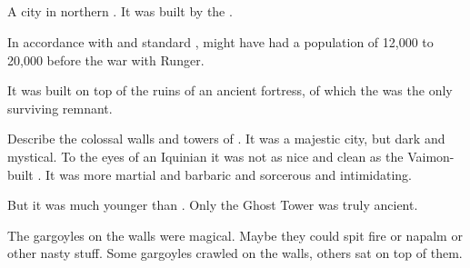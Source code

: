 \subsection{\Forclin}
A city in northern .
It was built by the . 

In accordance with  and standard , \Forclin might have had a population of 12,000 to 20,000 before the war with Runger.

It was built on top of the ruins of an ancient \resphan{} fortress, of which the  was the only surviving remnant. 

Describe the colossal walls and towers of \Forclin.
It was a majestic city, but dark and mystical. 
To the eyes of an Iquinian it was not as nice and clean as the Vaimon-built \Malcur. 
It was more martial and barbaric and sorcerous and intimidating. 

But it was much younger than \Malcur. 
Only the Ghost Tower was truly ancient. 

The gargoyles on the walls were magical.
Maybe they could spit fire or napalm or other nasty stuff. 
Some gargoyles crawled on the walls, others sat on top of them. 

